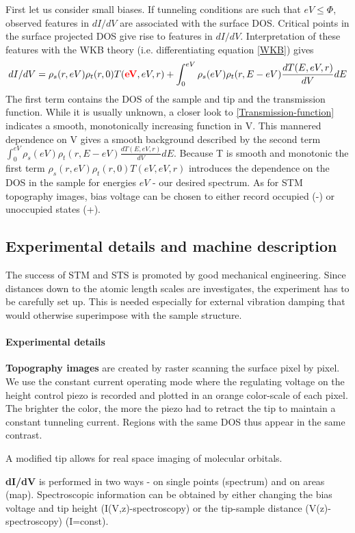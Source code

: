First let us consider small biases.
If tunneling conditions are such that $eV\leq\Phi$, observed features in $dI/dV$ are associated with the surface DOS. Critical points in the surface projected DOS give rise to features in $dI/dV$. Interpretation of these features with the WKB theory (i.e. differentiating equation \eqref{WKB}) gives
$$dI/dV=\rho_s(r,eV)\rho_t(r,0)T(\textcolor{red}{\textbf{eV}},eV,r)+\int_0^{eV}\rho_s(eV)\rho_t(r,E-eV)\frac{dT(E,eV,r)}{dV}dE$$
The first term contains the DOS of the sample and tip and the transmission function. While it is usually unknown, a closer look to \eqref{Transmission-function} indicates a smooth, monotonically increasing function in V. This mannered dependence on V gives a smooth background described by the second term $\int_0^{eV}\rho_s(eV)\rho_t(r,E-eV)\frac{dT(E,eV,r)}{dV}dE$.
Because T is smooth and monotonic the first term $\rho_s(r,eV)\rho_t(r,0)T(eV,eV,r)$ introduces the dependence on the DOS in the sample for energies $eV$ - our desired spectrum. As for STM topography images, bias voltage can be chosen to either record occupied (-) or unoccupied states (+).

\subsection{Experimental details and machine description}
The success of STM and STS is promoted by good mechanical engineering. Since distances down to the atomic length scales are investigates, the experiment has to be carefully set up. This is needed especially for external vibration damping that would otherwise superimpose with the sample structure.
\paragraph{Experimental details}

	\textbf{Topography images} are created by raster scanning the surface pixel by pixel. 
	We use the constant current operating mode where the regulating voltage on the height control piezo is recorded and plotted in an orange color-scale of each pixel. The brighter the color, the more the piezo had to retract the tip to maintain a constant tunneling current. Regions with the same DOS thus appear in the same contrast.

	A modified tip allows for real space imaging of molecular orbitals.

	\textbf{dI/dV} is performed in two ways - on single points (spectrum) and on areas (map). Spectroscopic information can be obtained by either changing the bias voltage and tip height (I(V,z)-spectroscopy) or the tip-sample distance (V(z)-spectroscopy) (I=const).  

